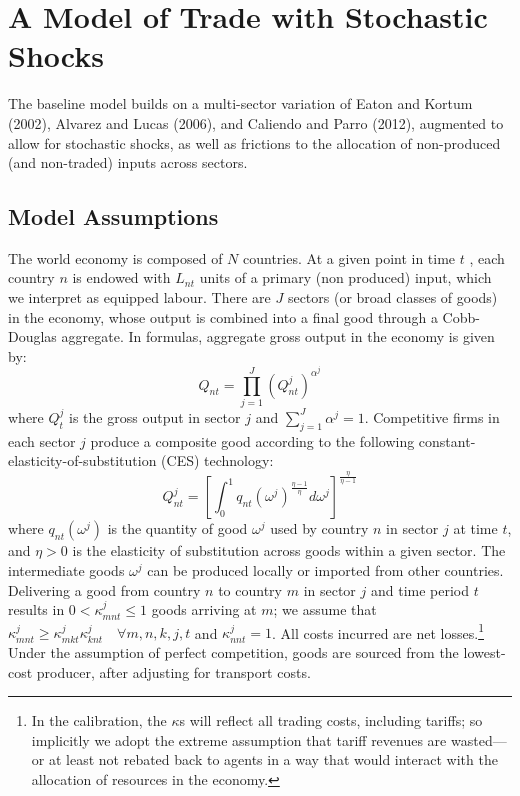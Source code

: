\documentclass[12pt]{article}
\begin{document}
\section{A Model of Trade with Stochastic Shocks}

The baseline model builds on a multi-sector variation of Eaton and Kortum
(2002), Alvarez and Lucas (2006), and Caliendo and Parro (2012), augmented
to allow for stochastic shocks, as well as frictions to the allocation of
non-produced (and non-traded) inputs across sectors.

\subsection{Model Assumptions}

The world economy is composed of $N$ countries. At a given point in time $t$%
, each country $n$ is endowed with $L_{nt}$ units of a primary (non
produced) input, which we interpret as equipped labour. There are $J$
sectors (or broad classes of goods) in the economy, whose output is combined
into a final good through a Cobb-Douglas aggregate. In formulas, aggregate
gross output in the economy is given by: 
\begin{equation}
Q_{nt}=\prod_{j=1}^{J}\left( Q_{nt}^{j}\right) ^{\alpha ^{j}}
\label{aggregate}
\end{equation}%
where $Q_{t}^{j}$ is the gross output in sector $j$ and $\sum_{j=1}^{J}%
\alpha ^{j}=1$. Competitive firms in each sector $j$ produce a composite
good according to the following constant-elasticity-of-substitution (CES)
technology: 
\begin{equation}
Q_{nt}^{j}=\left[ \int_{0}^{1}q_{nt}(\omega ^{j})^{\frac{\eta -1}{\eta }%
}d\omega ^{j}\right] ^{\frac{\eta }{\eta -1}}  \label{sectoroutput}
\end{equation}%
where $q_{nt}(\omega ^{j})$ is the quantity of good $\omega ^{j}$ used by
country $n$ in sector $j$ at time $t$, and $\eta >0$ is the elasticity of
substitution across goods within a given sector. The intermediate goods $%
\omega ^{j}$ can be produced locally or imported from other countries.
Delivering a good from country $n$ to country $m$ in sector $j$ and time
period $t$ results in $0<\kappa _{mnt}^{j}\leq 1$ goods arriving at $m$; we
assume that $\kappa _{mnt}^{j}\geq \kappa _{mkt}^{j}\kappa _{knt}^{j}\quad
\forall m,n,k,j,t$ and $\kappa _{nnt}^{j}=1$. All costs incurred are net
losses.\footnote{%
In the calibration, the $\kappa $s will reflect all trading costs, including
tariffs; so implicitly we adopt the extreme assumption that tariff revenues
are wasted---or at least not rebated back to agents in a way that would
interact with the allocation of resources in the economy.} Under the
assumption of perfect competition, goods are sourced from the lowest-cost
producer, after adjusting for transport costs.
\end{document}
